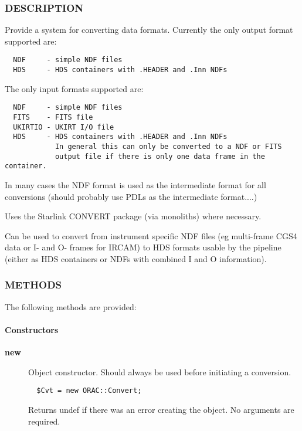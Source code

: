 \subsubsection*{DESCRIPTION\label{ORAC::Convert_DESCRIPTION}}

Provide a system for converting data formats. Currently the
only output format supported are:

\begin{verbatim}
  NDF     - simple NDF files
  HDS     - HDS containers with .HEADER and .Inn NDFs
\end{verbatim}


The only input formats supported are:

\begin{verbatim}
  NDF     - simple NDF files
  FITS    - FITS file
  UKIRTIO - UKIRT I/O file
  HDS     - HDS containers with .HEADER and .Inn NDFs
            In general this can only be converted to a NDF or FITS
            output file if there is only one data frame in the container.
\end{verbatim}


In many cases the NDF format is used as the intermediate format for
all conversions (should probably use PDLs as the intermediate
format....)



Uses the Starlink CONVERT package (via monoliths) where necessary.



Can be used to convert from instrument specific NDF files (eg
multi-frame CGS4 data or I- and O- frames for IRCAM) to HDS formats
usable by the pipeline (either as HDS containers or NDFs with combined
I and O information).

\subsubsection*{METHODS\label{ORAC::Convert_METHODS}}

The following methods are provided:

\paragraph*{Constructors\label{ORAC::Convert_Constructors}}\begin{description}
\item[\textbf{new}] \mbox{}

Object constructor. Should always be used before initiating a conversion.

\begin{verbatim}
  $Cvt = new ORAC::Convert;
\end{verbatim}


Returns undef if there was an error creating the object. No arguments
are required.

\end{description}

